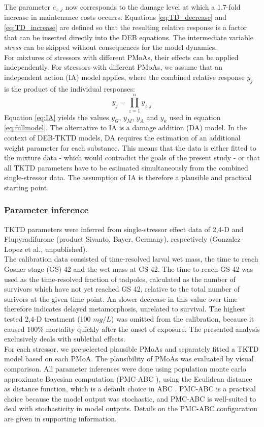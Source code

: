 The parameter $e_{z,j}$ now corresponds to the damage level at which a 1.7-fold increase in maintenance costs occurrs.  
Equations \ref{eq:TD_decrease} and \ref{eq:TD_increase} are defined so that the resulting relative response is a factor 
that can be inserted directly into the DEB equations. 
The intermediate variable \textit{stress} \citep{jagerRevisitingSimplifiedDEBtox2020}
can be skipped without consequences for the model dynamics. \\
%
For mixtures of stressors with different PMoAs, their effects can be applied independently. 
For stressors with different PMoAs, we assume that an independent action (IA) model applies, 
where the combined relative response $y_j$ is the product of the individual responses: 
%
\begin{equation}
    y_{j} = \prod\limits_{z=1}^{n} y_{z,j}
    \label{eq:IA}
\end{equation}
%
Equation \ref{eq:IA} yields the values $y_G$, $y_M$, $y_A$ and $y_{\kappa}$ used in equation \ref{eq:fullmodel}.
The alternative to IA is a damage addition (DA) model. In the context of DEB-TKTD models, DA requires the estimation 
of an additional weight parameter for each substance. This means that the data is either fitted to the mixture data - 
which would contradict the goals of the present study - or that all TKTD parameters have to be estimated simultaneously 
from the combined single-stressor data. The assumption of IA is therefore a plausible and practical starting point.
%
\subsubsection{Parameter inference}
%
TKTD parameters were inferred from single-stressor effect data of 2,4-D and Flupyradifurone (product Sivanto, Bayer, Germany), respectively 
(Gonzalez-Lopez et al., unpublished).\\ 
The calibration data consisted of time-resolved larval wet mass, 
the time to reach Gosner stage (GS) 42 and the wet mass at GS 42. 
The time to reach GS 42 was used as the time-resolved fraction 
of tadpoles, calculated as the number of survivors which have not yet reached GS 42, 
relative to the total number of surivors at the given time point.
An slower decrease in this value over time therefore indicates delayed metamorphosis, 
unrelated to survival.  
The highest tested 2,4-D treatment (100 $mg/L$) was omitted from the calibration, 
because it caused 100\% mortality quickly after the onset of exposure. 
The presented analysis exclusively deals with sublethal effects.\\
% 
For each stressor, we pre-selected plausible PMoAs and separately fitted a TKTD model based on each PMoA. 
The plausibility of PMoAs was evaluated by visual comparison.
%
All parameter inferences were done using population monte carlo approximate Bayesian computation 
(PMC-ABC \citep{beaumontAdaptiveApproximateBayesian2009}), 
using the Eculidean distance as distance function, which is a default choice in ABC \citep{prangleAdaptingABCDistance2017}. 
PMC-ABC is a practical choice because the model output was stochastic, 
and PMC-ABC is well-suited to deal with stochasticity in model outputs. 
Details on the PMC-ABC configuration are given in supporting information.\\
%
